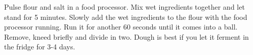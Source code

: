 \begin{recipe}

Pulse flour and salt in a food processor. Mix wet ingredients together and
let stand for 5 minutes. Slowly add the wet ingredients to the flour with the
food processor running. Run it for another 60 seconds until it comes into a
ball. Remove, kneed briefly and divide in two. Dough is best if you let it
ferment in the fridge for 3-4 days.

\end{recipe}

